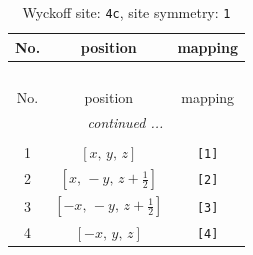 \documentclass[fleqn,8pt]{jsarticle}
\begin{document}
\begin{longtable}{ccc}
\caption{Wyckoff site: {\tt 4c}, site symmetry: {\tt 1}}
 \\
 \hline \hline
No. & position & mapping \\ \hline \endfirsthead

\multicolumn{2}{l}{\tablename\ \thetable{}} \\
 \hline \hline
No. & position & mapping \\ \hline \endhead

 \hline \hline
\multicolumn{2}{r}{\footnotesize\it continued ...} \\ \endfoot

 \hline \hline
\multicolumn{2}{r}{} \\ \endlastfoot

1 & $\left[ x,\, y,\, z \right]$ & {\tt [1]} \\ \hline
2 & $\left[ x,\, - y,\, z + \frac{1}{2} \right]$ & {\tt [2]} \\ \hline
3 & $\left[ - x,\, - y,\, z + \frac{1}{2} \right]$ & {\tt [3]} \\ \hline
4 & $\left[ - x,\, y,\, z \right]$ & {\tt [4]} \\
\end{longtable}
\end{document}
